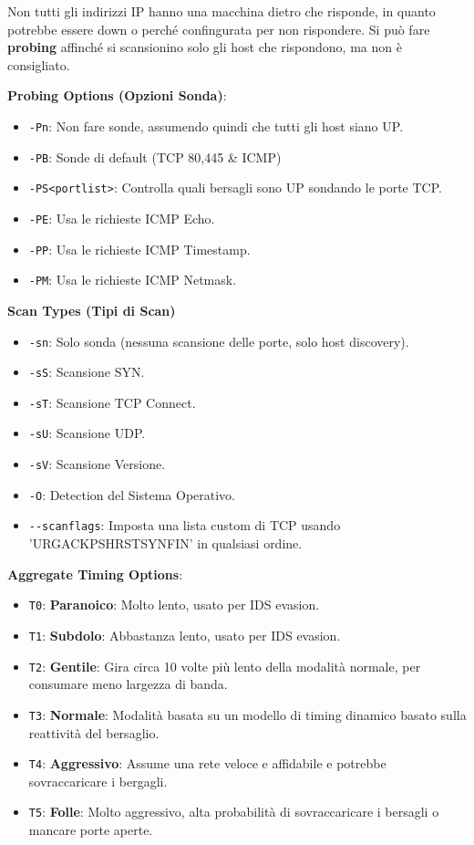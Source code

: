 \documentclass{article}
\begin{document}
Non tutti gli indirizzi IP hanno una macchina dietro che risponde, in quanto potrebbe essere down o perché confingurata per non rispondere. Si può fare \textbf{probing} affinché si scansionino solo gli host che rispondono, ma non è consigliato.

\textbf{Probing Options (Opzioni Sonda)}:
\begin{itemize}
    \item \verb|-Pn|: Non fare sonde, assumendo quindi che tutti gli host siano UP.
    \item \verb|-PB|: Sonde di default (TCP 80,445 \& ICMP)
    \item \verb|-PS<portlist>|: Controlla quali bersagli sono UP sondando le porte TCP.
    \item \verb|-PE|: Usa le richieste ICMP Echo.
    \item \verb|-PP|: Usa le richieste ICMP Timestamp.
    \item \verb|-PM|: Usa le richieste ICMP Netmask.
\end{itemize}

\textbf{Scan Types (Tipi di Scan)}
\begin{itemize}
    \item \verb|-sn|: Solo sonda (nessuna scansione delle porte, solo host discovery).
    \item \verb|-sS|: Scansione SYN.
    \item \verb|-sT|: Scansione TCP Connect.
    \item \verb|-sU|: Scansione UDP.
    \item \verb|-sV|: Scansione Versione.
    \item \verb|-O|: Detection del Sistema Operativo.
    \item \verb|--scanflags|: Imposta una lista custom di TCP usando 
    'URGACKPSHRSTSYNFIN' in qualsiasi ordine.
\end{itemize}

\newpage
\textbf{Aggregate Timing Options}:
\begin{itemize}
    \item \verb|T0|: \textbf{Paranoico}: Molto lento, usato per IDS evasion.
    \item \verb|T1|: \textbf{Subdolo}: Abbastanza lento, usato per IDS evasion.
    \item \verb|T2|: \textbf{Gentile}: Gira circa 10 volte più lento della modalità normale, per consumare meno largezza di banda.
    \item \verb|T3|: \textbf{Normale}: Modalità basata su un modello di timing dinamico basato sulla reattività del bersaglio.
    \item \verb|T4|: \textbf{Aggressivo}: Assume una rete veloce e affidabile e potrebbe sovraccaricare i bergagli.
    \item \verb|T5|: \textbf{Folle}: Molto aggressivo, alta probabilità di sovraccaricare i bersagli o mancare porte aperte.
\end{itemize}
\end{document}
